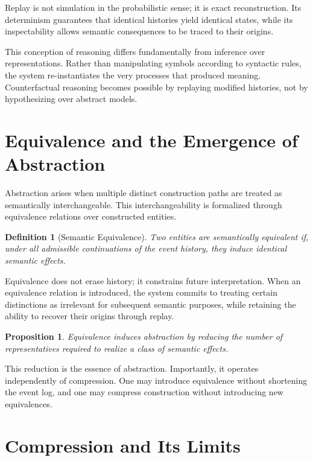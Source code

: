 \documentclass[11pt]{article}
\newtheorem{definition}{Definition}[section]
\newtheorem{proposition}{Proposition}[section]
\begin{document}
Replay is not simulation in the probabilistic sense; it is exact reconstruction. Its determinism guarantees that identical histories yield identical states, while its inspectability allows semantic consequences to be traced to their origins.

This conception of reasoning differs fundamentally from inference over representations. Rather than manipulating symbols according to syntactic rules, the system re-instantiates the very processes that produced meaning. Counterfactual reasoning becomes possible by replaying modified histories, not by hypothesizing over abstract models.

\section{Equivalence and the Emergence of Abstraction}

Abstraction arises when multiple distinct construction paths are treated as semantically interchangeable. This interchangeability is formalized through equivalence relations over constructed entities.

\begin{definition}[Semantic Equivalence]
Two entities are semantically equivalent if, under all admissible continuations of the event history, they induce identical semantic effects.
\end{definition}

Equivalence does not erase history; it constrains future interpretation. When an equivalence relation is introduced, the system commits to treating certain distinctions as irrelevant for subsequent semantic purposes, while retaining the ability to recover their origins through replay.

\begin{proposition}
Equivalence induces abstraction by reducing the number of representatives required to realize a class of semantic effects.
\end{proposition}

This reduction is the essence of abstraction. Importantly, it operates independently of compression. One may introduce equivalence without shortening the event log, and one may compress construction without introducing new equivalences.

\section{Compression and Its Limits}
\end{document}
